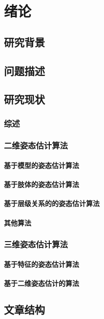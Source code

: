 


\chapter{绪论}
\section{研究背景}

\section{问题描述}

\section{研究现状}
\subsection{综述}

\subsection{二维姿态估计算法}
\subsubsection{基于模型的姿态估计算法}
\subsubsection{基于肢体的姿态估计算法}
\subsubsection{基于层级关系的的姿态估计算法}
\subsubsection{其他算法}

\subsection{三维姿态估计算法}
\subsubsection{基于特征的姿态估计算法}
\subsubsection{基于二维姿态估计的算法}

\section{文章结构}

